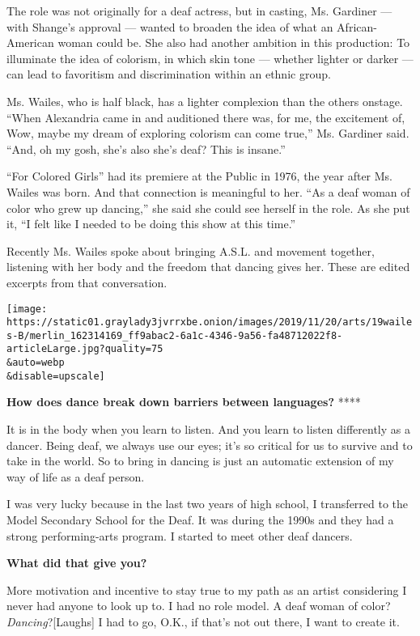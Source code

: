 The role was not originally for a deaf actress, but in casting, Ms.
Gardiner --- with Shange's approval --- wanted to broaden the idea of
what an African-American woman could be. She also had another ambition
in this production: To illuminate the idea of colorism, in which skin
tone --- whether lighter or darker --- can lead to favoritism and
discrimination within an ethnic group.

Ms. Wailes, who is half black, has a lighter complexion than the others
onstage. ``When Alexandria came in and auditioned there was, for me, the
excitement of, Wow, maybe my dream of exploring colorism can come
true,'' Ms. Gardiner said. ``And, oh my gosh, she's also she's deaf?
This is insane.''

``For Colored Girls'' had its premiere at the Public in 1976, the year
after Ms. Wailes was born. And that connection is meaningful to her.
``As a deaf woman of color who grew up dancing,'' she said she could see
herself in the role. As she put it, ``I felt like I needed to be doing
this show at this time.''

Recently Ms. Wailes spoke about bringing A.S.L. and movement together,
listening with her body and the freedom that dancing gives her. These
are edited excerpts from that conversation.

\texttt{[image: https://static01.graylady3jvrrxbe.onion/images/2019/11/20/arts/19wailes-B/merlin\_162314169\_ff9abac2-6a1c-4346-9a56-fa48712022f8-articleLarge.jpg?quality=75\\\&auto=webp\\\&disable=upscale]}

\textbf{How does dance break down barriers between languages?} ****

It is in the body when you learn to listen. And you learn to listen
differently as a dancer. Being deaf, we always use our eyes; it's so
critical for us to survive and to take in the world. So to bring in
dancing is just an automatic extension of my way of life as a deaf
person.

I was very lucky because in the last two years of high school, I
transferred to the Model Secondary School for the Deaf. It was during
the 1990s and they had a strong performing-arts program. I started to
meet other deaf dancers.

\textbf{What did that give you?}

More motivation and incentive to stay true to my path as an artist
considering I never had anyone to look up to. I had no role model. A
deaf woman of color? \emph{Dancing}?{[}Laughs{]} I had to go, O.K., if
that's not out there, I want to create it.

